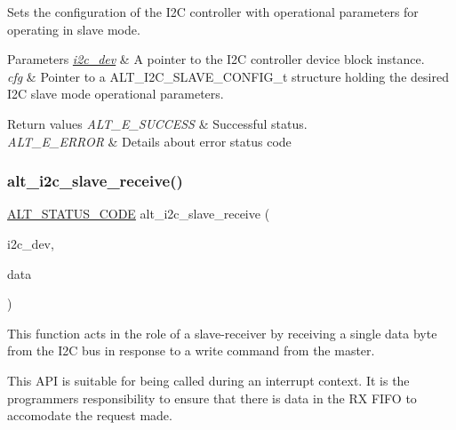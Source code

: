 Sets the configuration of the I2C controller with operational parameters for operating in slave mode.


\begin{DoxyParams}{Parameters}
{\em \mbox{\hyperlink{structi2c__dev}{i2c\+\_\+dev}}} & A pointer to the I2C controller device block instance.\\
\hline
{\em cfg} & Pointer to a A\+L\+T\+\_\+\+I2\+C\+\_\+\+S\+L\+A\+V\+E\+\_\+\+C\+O\+N\+F\+I\+G\+\_\+t structure holding the desired I2C slave mode operational parameters.\\
\hline
\end{DoxyParams}

\begin{DoxyRetVals}{Return values}
{\em A\+L\+T\+\_\+\+E\+\_\+\+S\+U\+C\+C\+E\+SS} & Successful status. \\
\hline
{\em A\+L\+T\+\_\+\+E\+\_\+\+E\+R\+R\+OR} & Details about error status code \\
\hline
\end{DoxyRetVals}
\mbox{\label{group__ALT__I2C_gaadba976480855d6b962cd0abbdb01c42}} 
\subsubsection{\texorpdfstring{alt\_i2c\_slave\_receive()}{alt\_i2c\_slave\_receive()}}
{\footnotesize\ttfamily \mbox{\hyperlink{hwlib_8h_abdb0d369f069723ca55d6c94bcaaaa12}{A\+L\+T\+\_\+\+S\+T\+A\+T\+U\+S\+\_\+\+C\+O\+DE}} alt\+\_\+i2c\+\_\+slave\+\_\+receive (\begin{DoxyParamCaption}\item[{\mbox{\hyperlink{structALT__I2C__DEV__s}{A\+L\+T\+\_\+\+I2\+C\+\_\+\+D\+E\+V\+\_\+t}} $\ast$}]{i2c\+\_\+dev,  }\item[{uint8\+\_\+t $\ast$}]{data }\end{DoxyParamCaption})}

This function acts in the role of a slave-\/receiver by receiving a single data byte from the I2C bus in response to a write command from the master.

This A\+PI is suitable for being called during an interrupt context. It is the programmer\textquotesingle{}s responsibility to ensure that there is data in the RX F\+I\+FO to accomodate the request made.

